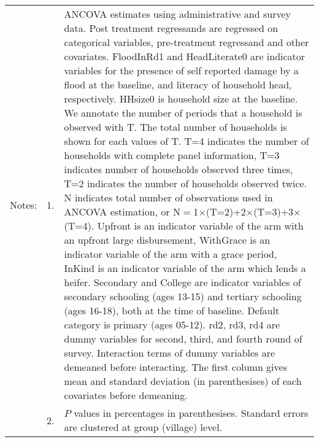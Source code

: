 \begin{minipage}[t]{14cm}
\begin{tabular}{>{\hfill\scriptsize}p{1cm}<{}>{\hfill\scriptsize}p{.25cm}<{}>{\scriptsize}p{14cm}<{\hfill}}
Notes: & 1. & ANCOVA estimates using administrative and survey data. Post treatment regressands are regressed on categorical variables, pre-treatment regressand and other covariates. \textsf{FloodInRd1} and \textsf{HeadLiterate0} are indicator variables for the presence of self reported damage by a flood at the baseline, and literacy of household head, respectively. \textsf{HHsize0} is household size at the baseline. We annotate the number of periods that a household is observed with \textsf{T}. The total number of households is shown for each values of \textsf{T}. \textsf{T=4} indicates the number of households with complete panel information, \textsf{T=3} indicates number of households observed three times, \textsf{T=2} indicates the number of households observed twice. \textsf{N} indicates total number of observations used in ANCOVA estimation, or \textsf{N$=$1$\times$(T=2)+2$\times$(T=3)+3$\times$(T=4)}.  \textsf{Upfront} is an indicator variable of the arm with an upfront large disbursement, \textsf{WithGrace} is an indicator variable of the arm with a grace period, \textsf{InKind} is an indicator variable of the arm which lends a heifer. \textsf{Secondary} and \textsf{College} are indicator variables of secondary schooling (ages 13-15) and tertiary schooling (ages 16-18), both at the time of baseline. Default category is primary (ages 05-12). \textsf{rd2, rd3, rd4} are dummy variables for second, third, and fourth round of survey. Interaction terms of dummy variables are demeaned before interacting. The first column gives mean and standard deviation (in parenthesises) of each covariates before demeaning.\\
& 2. & $P$ values in percentages in parenthesises. Standard errors are clustered at group (village) level.%
\end{tabular}
\end{minipage}

